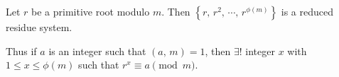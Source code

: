 \begin{note}
    Let $r$ be a primitive root modulo $m$. Then $\left\{r,\,r^2,\,\cdots,\,r^{\phi\left(m\right)}\right\}$
    is a reduced residue system.
    
    Thus if $a$ is an integer such that $\left(a,\,m\right)=1$,
    then $\exists!$ integer $x$ with $1\leq x \leq \phi\left(m\right)$ such that
    $r^x\equiv a \pmod{m}$.
\end{note}
